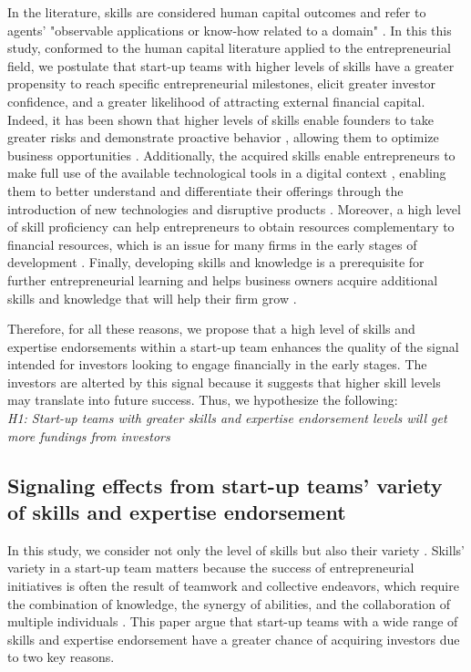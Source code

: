 \documentclass[12pt]{article}
\begin{document}
In the literature, skills are considered human capital outcomes and refer to agents’ "observable applications or know-how related to a domain" \citep{becker1964human, marvel2016human}. In this this study, conformed to the human capital literature applied to the entrepreneurial field, we postulate that start-up teams with higher levels of skills have a greater propensity to reach specific entrepreneurial milestones, elicit greater investor confidence, and a greater likelihood of attracting external financial capital. Indeed, it has been shown that higher levels of skills enable founders to take greater risks and demonstrate proactive behavior \citep{becherer1999proactive}, allowing them to optimize business opportunities \citep{shane2000promise, chandler1994founder}. Additionally, the acquired skills enable entrepreneurs to make full use of the available technological tools in a digital context \citep{nambisan2017digital}, enabling them to better understand and differentiate their offerings through the introduction of new technologies and disruptive products \citep{marvel2007technology}. Moreover, a high level of skill proficiency can help entrepreneurs to obtain resources complementary to financial resources, which is an issue for many firms in the early stages of development \citep{beckman2007early}. Finally, developing skills and knowledge is a prerequisite for further entrepreneurial learning and helps business owners acquire additional skills and knowledge that will help their firm grow \citep{hunter1986cognitive}.

Therefore, for all these reasons, we propose that a high level of skills and expertise endorsements within a start-up team enhances the quality of the signal intended for investors looking to engage financially in the early stages. The investors are alterted by this signal because it suggests that higher skill levels may translate into future success. Thus, we hypothesize the following: \\

\noindent \textit{H1: Start-up teams with greater skills and expertise endorsement levels will get more fundings from investors}

\subsection{Signaling effects from start-up teams' variety of skills and expertise endorsement}

In this study, we consider not only the level of skills but also their variety \citep{harrison2007s}. Skills' variety in a start-up team matters because the success of entrepreneurial initiatives is often the result of teamwork and collective endeavors, which require the combination of knowledge, the synergy of abilities, and the collaboration of multiple individuals \citep{klotz2014new}. This paper argue that start-up teams with a wide range of skills and expertise endorsement have a greater chance of acquiring investors due to two key reasons.
\end{document}
